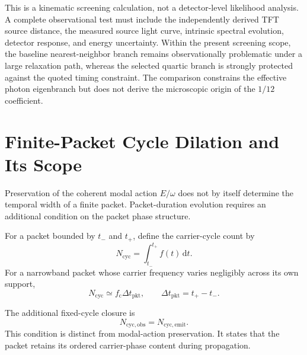 This is a kinematic screening calculation, not a detector-level likelihood
analysis. A complete observational test must include the independently derived
TFT source distance, the measured source light curve, intrinsic spectral
evolution, detector response, and energy uncertainty. Within the present
screening scope, the baseline nearest-neighbor branch remains observationally
problematic under a large relaxation path, whereas the selected quartic branch
is strongly protected against the quoted timing constraint. The comparison
constrains the effective photon eigenbranch but does not derive the microscopic
origin of the \(1/12\) coefficient.


\section{Finite-Packet Cycle Dilation and Its Scope}
\label{sec:photon_relaxation_packet_dilation_scope}

Preservation of the coherent modal action
\(E/\omega\)
does not by itself determine the temporal width of a finite packet.
Packet-duration evolution requires an additional condition on the packet
phase structure.

For a packet bounded by \(t_{-}\) and \(t_{+}\), define the carrier-cycle
count by
\begin{equation}
    N_{\mathrm{cyc}}
    =
    \int_{t_{-}}^{t_{+}}
    f(t)
    \,\mathrm{d}t.
    \label{eq:photon_relaxation_packet_cycle_count}
\end{equation}
For a narrowband packet whose carrier frequency varies negligibly across its
own support,
\begin{equation}
    N_{\mathrm{cyc}}
    \simeq
    f_{\mathrm{c}}
    \Delta t_{\mathrm{pkt}},
    \qquad
    \Delta t_{\mathrm{pkt}}
    =
    t_{+}
    -
    t_{-}.
    \label{eq:photon_relaxation_narrowband_cycle_count}
\end{equation}

The additional fixed-cycle closure is
\begin{equation}
    N_{\mathrm{cyc,obs}}
    =
    N_{\mathrm{cyc,emit}}.
    \label{eq:photon_relaxation_packet_cycle_conservation}
\end{equation}
This condition is distinct from modal-action preservation. It states that the
packet retains its ordered carrier-phase content during propagation.

